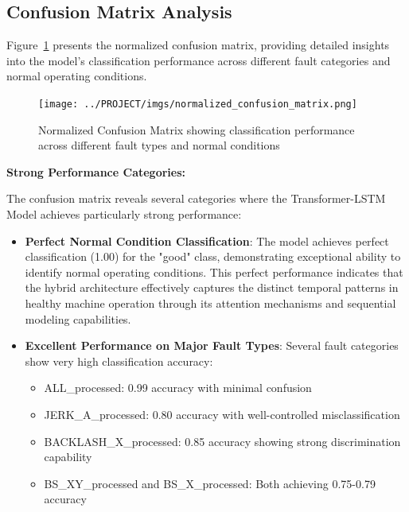 \subsection{Confusion Matrix Analysis}
\label{subsec:confusion_matrix_analysis}

Figure~\ref{fig:normalized_confusion_matrix} presents the normalized confusion matrix, providing detailed insights into the model's classification performance across different fault categories and normal operating conditions.

\begin{figure}[ht]
\centering
\texttt{[image: ../PROJECT/imgs/normalized\_confusion\_matrix.png]}
\caption{Normalized Confusion Matrix showing classification performance across different fault types and normal conditions}
\label{fig:normalized_confusion_matrix}
\end{figure}

\textbf{Strong Performance Categories:}

The confusion matrix reveals several categories where the Transformer-LSTM Model achieves particularly strong performance:

\begin{itemize}
    \item \textbf{Perfect Normal Condition Classification}: The model achieves perfect classification (1.00) for the "good" class, demonstrating exceptional ability to identify normal operating conditions. This perfect performance indicates that the hybrid architecture effectively captures the distinct temporal patterns in healthy machine operation through its attention mechanisms and sequential modeling capabilities.
    
    \item \textbf{Excellent Performance on Major Fault Types}: Several fault categories show very high classification accuracy:
    \begin{itemize}
        \item ALL\_processed: 0.99 accuracy with minimal confusion
        \item JERK\_A\_processed: 0.80 accuracy with well-controlled misclassification
        \item BACKLASH\_X\_processed: 0.85 accuracy showing strong discrimination capability
        \item BS\_XY\_processed and BS\_X\_processed: Both achieving 0.75-0.79 accuracy
    \end{itemize}
\end{itemize}


